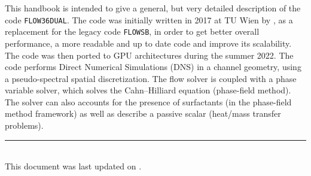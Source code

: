 This handbook is intended to give a general, but very detailed description of the code \texttt{FLOW36DUAL}.
The code was initially written in 2017 at TU Wien by \@author, as a replacement for the legacy code \texttt{FLOWSB}, in order to get better overall performance, a more readable and up to date code and improve its scalability.
The code was then ported to GPU architectures during the summer 2022.
The code performs Direct Numerical Simulations (DNS) in a channel geometry, using a pseudo-spectral spatial discretization. 
The flow solver is coupled with a phase variable solver, which solves the Cahn--Hilliard equation (phase-field method).
The solver can also accounts for the presence of surfactants (in the phase-field method framework) as well as describe a passive scalar (heat/mass transfer problems).


\vfill
\rule{14cm}{0.4pt}\\

This document was last updated on \@date.